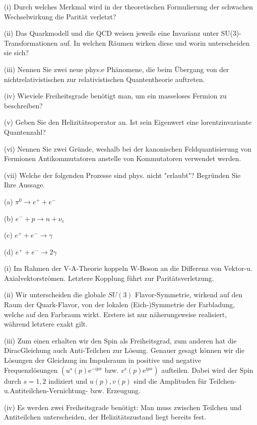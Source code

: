 \documentclass[10pt, letterpaper]{article}
\begin{document}
(i) Durch welches Merkmal wird in der theoretischen Formulierung der schwachen Wechselwirkung die Parität verletzt?

(ii) Das Quarkmodell und die QCD weisen jeweils eine Invarianz unter SU(3)-Transformationen auf. In welchen Räumen wirken diese und worin unterscheiden sie sich?

(iii) Nennen Sie zwei neue phys.e Phänomene, die beim Übergang von der nichtrelativistischen zur relativistischen Quantentheorie auftreten.

(iv) Wieviele Freiheitsgrade benötigt man, um ein masseloses Fermion zu beschreiben?

(v) Geben Sie den Helizitätsoperator an. Ist sein Eigenwert eine lorentzinvariante Quantenzahl?

(vi) Nennen Sie zwei Gründe, weshalb bei der kanonischen Feldquantisierung von Fermionen Antikommutatoren anstelle von Kommutatoren verwendet werden.

(vii) Welche der folgenden Prozesse sind phys. nicht "erlaubt"? Begründen Sie Ihre Aussage.

(a) $\pi^0 \rightarrow e^{+}+e^{-}$

(b) $e^{-}+p \rightarrow n+\nu_e$

(c) $e^{+}+e^{-} \rightarrow \gamma$

(d) $e^{+}+e^{-} \rightarrow 2 \gamma$


(i) Im Rahmen der V-A-Theorie koppeln W-Boson an die Differenz von Vektor-u. Axialvektorströmen. Letztere Kopplung führt zur Paritätsverletzung.

(ii) Wir unterscheiden die globale $S U(3)$ Flavor-Symmetrie, wirkend auf den Raum der Quark-Flavor, von der lokalen (Eich-)Symmetrie der Farbladung, welche auf den Farbraum wirkt. Erstere ist nur näherungsweise realisiert, während letztere exakt gilt.

(iii) Zum einen erhalten wir den Spin als Freiheitsgrad, zum anderen hat die DiracGleichung auch Anti-Teilchen zur Lösung. Genauer gesagt können wir die Lösungen der Gleichung im Impulsraum in positive und negative Frequenzlösungen $\left(u^s(p) \mathrm{e}^{-i p x}\right.$ bzw. $\left.v^s(p) \mathrm{e}^{i p x}\right)$ aufteilen. Dabei wird der Spin durch $s=1,2$ indiziert und $u(p), v(p)$ sind die Amplituden für Teilchen-u.Antiteilchen-Vernichtung- bzw. Erzeugung.

(iv) Es werden zwei Freiheitsgrade benötigt: Man muss zwischen Teilchen und Antiteilchen unterscheiden, der Helizitätszustand liegt bereits fest.
\end{document}
